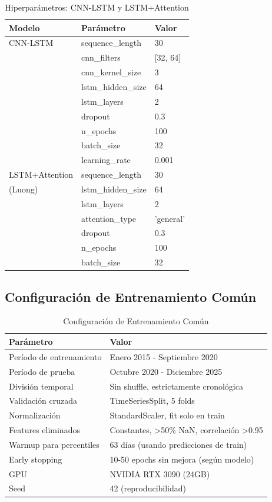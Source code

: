\begin{table}[htbp]
\centering
\caption{Hiperpar\'ametros: CNN-LSTM y LSTM+Attention}
\label{tab:hyper_hybrid}
\small
\begin{tabular}{@{}llp{6cm}@{}}
\toprule
\textbf{Modelo} & \textbf{Par\'ametro} & \textbf{Valor} \\
\midrule
CNN-LSTM & sequence\_length & 30 \\
 & cnn\_filters & [32, 64] \\
 & cnn\_kernel\_size & 3 \\
 & lstm\_hidden\_size & 64 \\
 & lstm\_layers & 2 \\
 & dropout & 0.3 \\
 & n\_epochs & 100 \\
 & batch\_size & 32 \\
 & learning\_rate & 0.001 \\
\midrule
LSTM+Attention & sequence\_length & 30 \\
(Luong) & lstm\_hidden\_size & 64 \\
 & lstm\_layers & 2 \\
 & attention\_type & 'general' \\
 & dropout & 0.3 \\
 & n\_epochs & 100 \\
 & batch\_size & 32 \\
\bottomrule
\end{tabular}
\end{table}

\subsection{Configuraci\'on de Entrenamiento Com\'un}
\label{app:training_config}

\begin{table}[htbp]
\centering
\caption{Configuraci\'on de Entrenamiento Com\'un}
\label{tab:training_common}
\begin{tabular}{@{}lp{10cm}@{}}
\toprule
\textbf{Par\'ametro} & \textbf{Valor} \\
\midrule
Per\'iodo de entrenamiento & Enero 2015 - Septiembre 2020 \\
Per\'iodo de prueba & Octubre 2020 - Diciembre 2025 \\
Divisi\'on temporal & Sin shuffle, estrictamente cronol\'ogica \\
Validaci\'on cruzada & TimeSeriesSplit, 5 folds \\
Normalizaci\'on & StandardScaler, fit solo en train \\
Features eliminados & Constantes, >50\% NaN, correlaci\'on >0.95 \\
Warmup para percentiles & 63 d\'ias (usando predicciones de train) \\
Early stopping & 10-50 epochs sin mejora (seg\'un modelo) \\
GPU & NVIDIA RTX 3090 (24GB) \\
Seed & 42 (reproducibilidad) \\
\bottomrule
\end{tabular}
\end{table}
